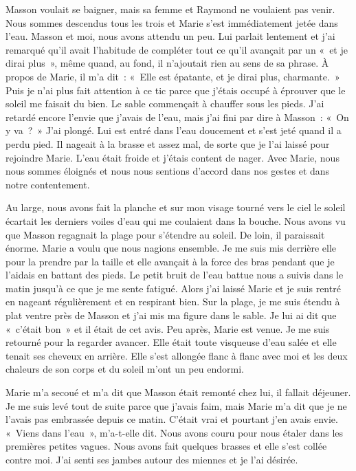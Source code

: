 \documentclass[french,twoside]{book} %
\begin{document}
Masson voulait se baigner, mais sa femme et Raymond ne voulaient pas venir. Nous sommes descendus tous les trois et Marie s’est immédiatement jetée dans l’eau. Masson et moi, nous avons attendu un peu. Lui parlait lentement et j’ai remarqué qu’il avait l’habitude de compléter tout ce qu’il avançait par un « et je dirai plus », même quand, au fond, il n’ajoutait rien au sens de sa phrase. À propos de Marie, il m’a dit : « Elle est épatante, et je dirai plus, charmante. » Puis je n’ai plus fait attention à ce tic parce que j’étais occupé à éprouver que le soleil me faisait du bien. Le sable commençait à chauffer sous les pieds. J'ai retardé encore l’envie que j’avais de l’eau, mais j’ai fini par dire à Masson : « On y va ? » J'ai plongé. Lui est entré dans l’eau doucement et s’est jeté quand il a perdu pied. Il nageait à la brasse et assez mal, de sorte que je l’ai laissé pour rejoindre Marie. L'eau était froide et j’étais content de nager. Avec Marie, nous nous sommes éloignés et nous nous sentions d’accord dans nos gestes et dans notre contentement.\par
Au large, nous avons fait la planche et sur mon visage tourné vers le ciel le soleil écartait les derniers voiles d’eau qui me coulaient dans la bouche. Nous avons vu que Masson regagnait la plage pour s’étendre au soleil. De loin, il paraissait énorme. Marie a voulu que nous nagions ensemble. Je me suis mis derrière elle pour la prendre par la taille et elle avançait à la force des bras pendant que je l’aidais en battant des pieds. Le petit bruit de l’eau battue nous a suivis dans le matin jusqu’à ce que je me sente fatigué. Alors j’ai laissé Marie et je suis rentré en nageant régulièrement et en respirant bien. Sur la plage, je me suis étendu à plat ventre près de Masson et j’ai mis ma figure dans le sable. Je lui ai dit que « c’était bon » et il était de cet avis. Peu après, Marie est venue. Je me suis retourné pour la regarder avancer. Elle était toute visqueuse d’eau salée et elle tenait ses cheveux en arrière. Elle s’est allongée flanc à flanc avec moi et les deux chaleurs de son corps et du soleil m’ont un peu endormi.\par
Marie m’a secoué et m’a dit que Masson était remonté chez lui, il fallait déjeuner. Je me suis levé tout de suite parce que j’avais faim, mais Marie m’a dit que je ne l’avais pas embrassée depuis ce matin. C'était vrai et pourtant j’en avais envie. « Viens dans l’eau », m’a-t-elle dit. Nous avons couru pour nous étaler dans les premières petites vagues. Nous avons fait quelques brasses et elle s’est collée contre moi. J'ai senti ses jambes autour des miennes et je l’ai désirée.\par
\end{document}
